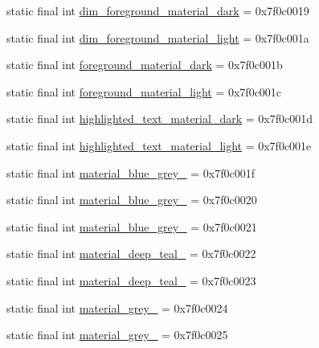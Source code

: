 \begin{CompactItemize}
\item 
static final int \hyperlink{classandroid_1_1support_1_1mediacompat_1_1_r_1_1color_3aacf8530f65450a1e0bfed8f6901341}{dim\_\-foreground\_\-material\_\-dark} = 0x7f0c0019
\item 
static final int \hyperlink{classandroid_1_1support_1_1mediacompat_1_1_r_1_1color_c1b99b9bc1a83659e8661cfd1697bcf0}{dim\_\-foreground\_\-material\_\-light} = 0x7f0c001a
\item 
static final int \hyperlink{classandroid_1_1support_1_1mediacompat_1_1_r_1_1color_6c9587cdaccb8e42b4bd64e8bd354e73}{foreground\_\-material\_\-dark} = 0x7f0c001b
\item 
static final int \hyperlink{classandroid_1_1support_1_1mediacompat_1_1_r_1_1color_69c4c0079a4930d8710755985d0be660}{foreground\_\-material\_\-light} = 0x7f0c001c
\item 
static final int \hyperlink{classandroid_1_1support_1_1mediacompat_1_1_r_1_1color_afe7449df862c9c0f75a7d3c97173cea}{highlighted\_\-text\_\-material\_\-dark} = 0x7f0c001d
\item 
static final int \hyperlink{classandroid_1_1support_1_1mediacompat_1_1_r_1_1color_523359e586ddf4539c99d29e05048fc4}{highlighted\_\-text\_\-material\_\-light} = 0x7f0c001e
\item 
static final int \hyperlink{classandroid_1_1support_1_1mediacompat_1_1_r_1_1color_0e148082a08713db8daec59966613608}{material\_\-blue\_\-grey\_} = 0x7f0c001f
\item 
static final int \hyperlink{classandroid_1_1support_1_1mediacompat_1_1_r_1_1color_a6c25754dc572a9fbd14597198f816ff}{material\_\-blue\_\-grey\_} = 0x7f0c0020
\item 
static final int \hyperlink{classandroid_1_1support_1_1mediacompat_1_1_r_1_1color_d7651c126f654ca4abe17bbdce37d26f}{material\_\-blue\_\-grey\_} = 0x7f0c0021
\item 
static final int \hyperlink{classandroid_1_1support_1_1mediacompat_1_1_r_1_1color_3f4fef3eb4fbd2af0064988f80114d68}{material\_\-deep\_\-teal\_} = 0x7f0c0022
\item 
static final int \hyperlink{classandroid_1_1support_1_1mediacompat_1_1_r_1_1color_d6c55d85376d5477b70ca95478771af5}{material\_\-deep\_\-teal\_} = 0x7f0c0023
\item 
static final int \hyperlink{classandroid_1_1support_1_1mediacompat_1_1_r_1_1color_ce725bb12bb01c169e50cc5a3f690cfd}{material\_\-grey\_} = 0x7f0c0024
\item 
static final int \hyperlink{classandroid_1_1support_1_1mediacompat_1_1_r_1_1color_d21734c43f70df6b11974f73b2ed35e3}{material\_\-grey\_} = 0x7f0c0025

\end{CompactItemize}
